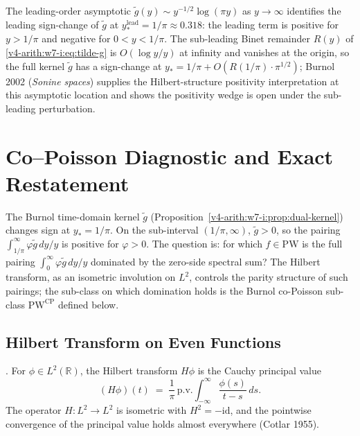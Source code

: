 \begin{remark}
\label{v4-arith:w7-i:rem:sign-tilde-g}
The leading-order asymptotic
\(\widetilde g(y)\sim y^{-1/2}\log(\pi y)\) as \(y\to\infty\)
identifies the leading sign-change of \(\widetilde g\) at
\(y_{\ast}^{\mathrm{lead}}=1/\pi\approx 0.318\): the leading term is
positive for \(y>1/\pi\) and negative for \(0<y<1/\pi\). The
sub-leading Binet remainder \(R(y)\) of
\eqref{v4-arith:w7-i:eq:tilde-g} is \(O(\log y/y)\) at infinity and
vanishes at the origin, so the full kernel \(\widetilde g\) has a
sign-change at \(y_{\ast}=1/\pi+O(R(1/\pi)\cdot\pi^{1/2})\); Burnol
2002 (\emph{Sonine spaces}) supplies the Hilbert-structure
positivity interpretation at this asymptotic location and shows the
positivity wedge is open under the sub-leading perturbation.
\end{remark}

\section{Co--Poisson Diagnostic and Exact Restatement}
\label{v4-arith:w7-i:copoisson-subclass}

The Burnol time-domain kernel \(\widetilde g\) (Proposition~\ref{v4-arith:w7-i:prop:dual-kernel}) changes sign at \(y_{\ast}=1/\pi\). On the
sub-interval \((1/\pi,\infty)\), \(\widetilde g>0\), so the pairing
\(\int_{1/\pi}^{\infty}\varphi\widetilde g\,dy/y\) is positive for
\(\varphi>0\). The question is: for which \(f\in\mathrm{PW}\) is the
full pairing \(\int_{0}^{\infty}\varphi\widetilde g\,dy/y\) dominated
by the zero-side spectral sum? The Hilbert transform, as an isometric
involution on \(L^{2}\), controls the parity structure of such
pairings; the sub-class on which domination holds is the Burnol
co-Poisson sub-class \(\mathrm{PW}^{\mathrm{CP}}\) defined below.

\subsection{Hilbert Transform on Even Functions}
\label{v4-arith:w7-i:copoisson:hilbert}

\begin{definition}
\label{v4-arith:w7-i:def:hilbert}
\ClaimStatusDefinitional. For \(\phi\in L^{2}(\mathbb{R})\), the Hilbert
transform \(H\phi\) is the Cauchy principal value
\begin{equation}
\label{v4-arith:w7-i:eq:hilbert}
(H\phi)(t)\;=\;\frac{1}{\pi}\,\mathrm{p.v.}\!\int_{-\infty}^{\infty}\frac{\phi(s)}{t-s}\,ds.
\end{equation}
The operator \(H\colon L^{2}\to L^{2}\) is isometric with
\(H^{2}=-\mathrm{id}\), and the pointwise convergence of the principal
value holds almost everywhere (Cotlar 1955).
\end{definition}

